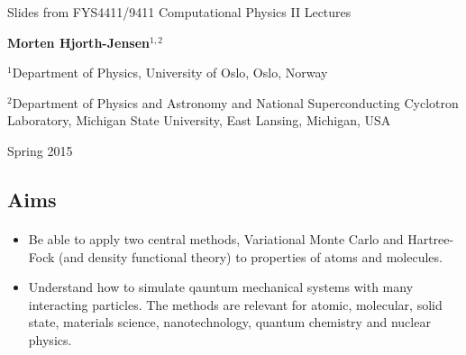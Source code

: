 \documentclass[%
twoside,                 %
final,                   %
10pt]{article}
\begin{document}






\thispagestyle{empty}

\begin{center}
{\LARGE\bf
\begin{spacing}{1.25}
Slides from FYS4411/9411 Computational Physics II Lectures
\end{spacing}
}
\end{center}


\begin{center}
{\bf Morten Hjorth-Jensen${}^{1, 2}$} \\ [0mm]
\end{center}

    \begin{center}
\centerline{{\small ${}^1$Department of Physics, University of Oslo, Oslo, Norway}}
\centerline{{\small ${}^2$Department of Physics and Astronomy and National Superconducting Cyclotron Laboratory, Michigan State University, East Lansing, Michigan, USA}}
\end{center}
    

\begin{center} %
Spring 2015
\end{center}

\vspace{1cm}


\subsection{Aims}

\paragraph{}
\begin{itemize}
\item Be able to apply two central methods, Variational Monte Carlo and Hartree-Fock (and density functional theory) to properties of atoms and molecules.

\item Understand how to simulate qauntum mechanical systems with many interacting particles. The methods are relevant for atomic, molecular, solid state, materials science, nanotechnology, quantum chemistry  and nuclear physics. 
\end{itemize}
\end{document}
